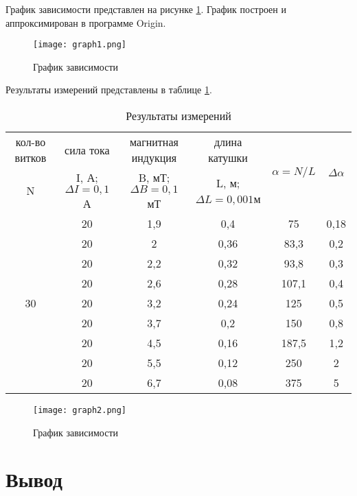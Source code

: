 \documentclass[12pt,a4paper]{article}
\begin{document}
График зависимости  представлен на рисунке \ref{im:graph1}. График построен и аппроксимирован в программе Origin. 

\begin{figure}[h!]
	\centering
	\texttt{[image: graph1.png]}
	\caption{График зависимости }	
	\label{im:graph1}	
\end{figure}

Результаты измерений представлены в таблице \ref{tab:data2}. 
\begin{table}[h]
	\caption{Результаты измерений }
	\centering
	\label{tab:data2}
	\begin{tabular}{| c | c | c | c | c | c |} \hline
кол-во витков & сила тока & магнитная индукция & длина катушки &\multirow{2}{*}{$\alpha = N/L$} & \multirow{2}{*}{$\Delta\alpha$} \\ \cline{1-4}
N& I, А; $\Delta I = 0{,}1$А & B, мТ;  $\Delta B = 0{,}1$мТ	& L, м; $\Delta L = 0{,}001$м & & \\ \hline
\multirow{9}{*}{30} &20 & 1,9 &	0,4	 & 75	&  0,18 \\  \cline{2-6}
&20 & 2	 &  0,36 &	83,3  & 0,2                 \\  \cline{2-6}
&20 & 2,2 &	0,32 &	93,8  & 0,3                 \\  \cline{2-6}
&20 & 2,6 &	0,28 &	107,1 &	0,4                 \\  \cline{2-6}
&20 & 3,2 &	0,24 &	125	  & 0,5                 \\  \cline{2-6}
&20 & 3,7 &	0,2	 &	150	  & 0,8                 \\  \cline{2-6}
&20 & 4,5 &	0,16 &	187,5 &	1,2                 \\  \cline{2-6}
&20 & 5,5 &	0,12 &	250	  & 2                   \\  \cline{2-6}
&20 & 6,7 &	0,08 &	375	  & 5                   \\
		\hline
	\end{tabular}
\end{table}	

\begin{figure}[h!]
	\centering
	\texttt{[image: graph2.png]}
	\caption{График зависимости}	
	\label{im:graph2}	
\end{figure}


\section{Вывод}
\end{document}
